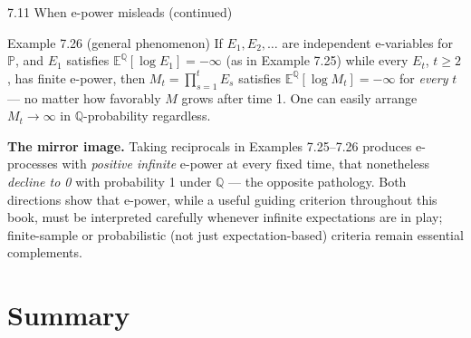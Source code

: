 \documentclass[aspectratio=169,10pt]{beamer}
\begin{document}
\begin{frame}[allowframebreaks]{7.11 When e-power misleads (continued)}

\begin{block}{Example 7.26 (general phenomenon)}
If $E_1,E_2,\dots$ are independent e-variables for $\mathbb P$, and $E_1$ satisfies
$\mathbb E^{\mathbb Q}[\log E_1] = -\infty$ (as in Example 7.25) while every $E_t$, $t\ge2$, has finite e-power,
then $M_t = \prod_{s=1}^t E_s$ satisfies $\mathbb E^{\mathbb Q}[\log M_t] = -\infty$ for \emph{every} $t$ --- no
matter how favorably $M$ grows after time 1. One can easily arrange $M_t \to \infty$ in $\mathbb Q$-probability
regardless.
\end{block}

\framebreak

\textbf{The mirror image.} Taking reciprocals in Examples 7.25--7.26 produces e-processes with \emph{positive
infinite} e-power at every fixed time, that nonetheless \emph{decline to 0} with probability 1 under $\mathbb Q$
--- the opposite pathology. Both directions show that e-power, while a useful guiding criterion throughout this
book, must be interpreted carefully whenever infinite expectations are in play; finite-sample or probabilistic
(not just expectation-based) criteria remain essential complements.

\end{frame}

\section{Summary}
\end{document}
